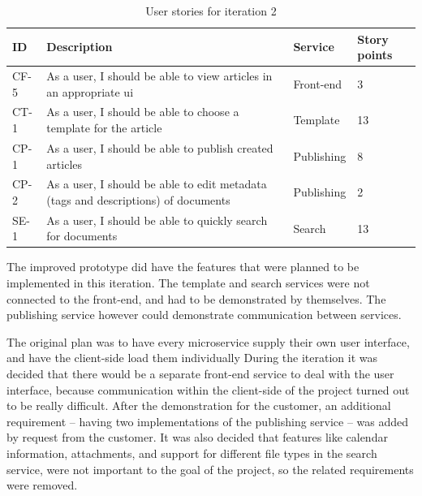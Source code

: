 \begin{table}[H]
   \caption{User stories for iteration 2 }
   \centering
   \label{tab:iter2_stories}
   \begin{tabular}{|p{1.3cm}|p{6cm}|p{3cm}|p{2.5cm}|}\hline%
        ID & Description & Service & Story points\\\hline\hline
        
        CF-5 & As a user, I should be able to view articles in an appropriate \acrshort{ui} & Front-end & 3 \\ \hline
        CT-1 & As a user, I should be able to choose a template for the article & Template & 13 \\ \hline
        CP-1 & As a user, I should be able to publish created articles & Publishing & 8 \\ \hline
        CP-2 & As a user, I should be able to edit metadata (tags and descriptions) of documents & Publishing & 2 \\ \hline
        SE-1 & As a user, I should be able to quickly search for documents & Search & 13 \\ \hline
    \end{tabular}
\end{table}

The improved prototype did have the features that were planned to be implemented in this iteration. The template and search services were not connected to the front-end, and had to be demonstrated by themselves. The publishing service however could demonstrate communication between services.

The original plan was to have every microservice supply their own user interface, and have the client-side load them individually
During the iteration it was decided that there would be a separate front-end service to deal with the user interface, because communication within the client-side of the project turned out to be really difficult. After the demonstration for the customer, an additional requirement -- having two implementations of the publishing service -- was added by request from the customer. It was also decided that features like calendar information, attachments, and support for different file types in the search service, were not important to the goal of the project, so the related requirements were removed.